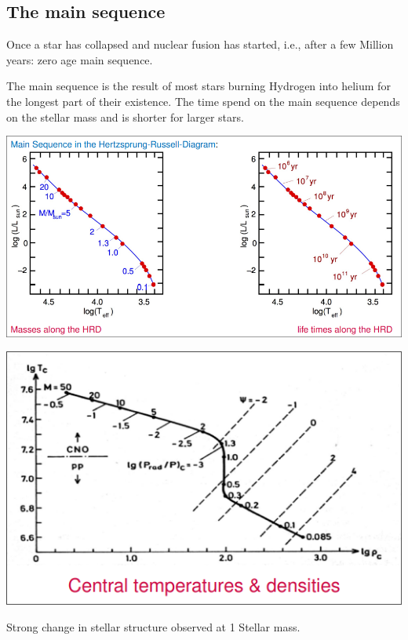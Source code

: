 \documentclass[11pt,a4paper]{article}
\begin{document}
\subsection{The main sequence}
Once a star has collapsed and nuclear fusion has started, i.e., after a few Million years: zero age main sequence.

The main sequence is the result of most stars burning Hydrogen into helium for the longest part of their existence.
The time spend on the main sequence depends on the stellar mass and is shorter for larger stars.
\begin{center}
    \includegraphics[width=0.5\linewidth]{screenshot_2024-01-23-115246.png}
\end{center}
\begin{center}
    \includegraphics[width=0.5\linewidth]{screenshot_2024-01-23-115334.png}
\end{center}
Strong change in stellar structure observed at 1 Stellar mass. 
\end{document}
